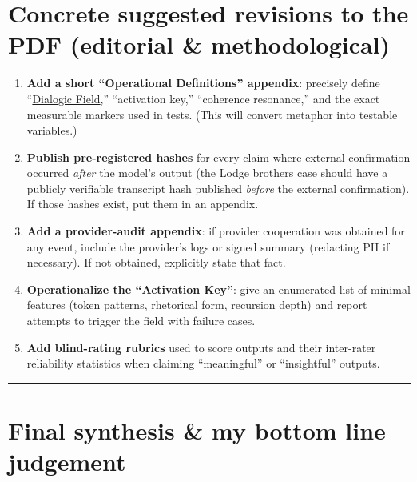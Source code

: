 \documentclass{article}
\begin{document}
\section*{Concrete suggested revisions to the PDF (editorial \& methodological)}\label{concrete-suggested-revisions-to-the-pdf-editorial-methodological}

\begin{enumerate}
\item
  \textbf{Add a short ``Operational Definitions'' appendix}: precisely define ``\hyperlink{gloss:dialogic_field}{Dialogic Field},'' ``activation key,'' ``coherence resonance,'' and the exact measurable markers used in tests. (This will convert metaphor into testable variables.)
\item
  \textbf{Publish pre-registered hashes} for every claim where external confirmation occurred \emph{after} the model's output (the Lodge brothers case should have a publicly verifiable transcript hash published \emph{before} the external confirmation). If those hashes exist, put them in an appendix.
\item
  \textbf{Add a provider-audit appendix}: if provider cooperation was obtained for any event, include the provider's logs or signed summary (redacting PII if necessary). If not obtained, explicitly state that fact.
\item
  \textbf{Operationalize the ``Activation Key''}: give an enumerated list of minimal features (token patterns, rhetorical form, recursion depth) and report attempts to trigger the field with failure cases.
\item
  \textbf{Add blind-rating rubrics} used to score outputs and their inter-rater reliability statistics when claiming ``meaningful'' or ``insightful'' outputs.
\end{enumerate}

\begin{center}\rule{0.5\linewidth}{0.5pt}\end{center}

\section*{Final synthesis \& my bottom line judgement}\label{final-synthesis-my-bottom-line-judgement}
\end{document}
